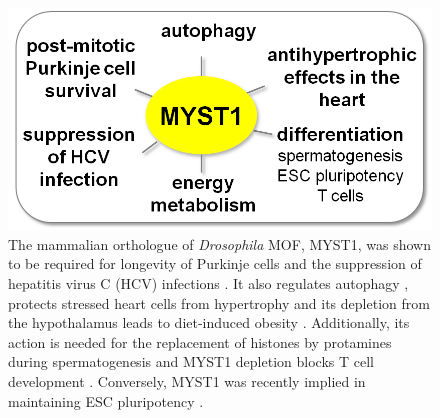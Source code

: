 \begin{figure}[b]
 \begin{minipage}[c]{0.48\textwidth}
   \includegraphics[width=\textwidth]{Figures/MOFothers.png}
 \end{minipage}\hfill
 \begin{minipage}[c]{0.48\textwidth}
	\begin{footnotesize}
   \caption[Functions of the mammalian orthologue of MOF, MYST1.]{\textsf{The mammalian orthologue of \textit{Drosophila} MOF, MYST1, was shown to be required for longevity of Purkinje cells \citep{Kumar2011} and the suppression of hepatitis virus C (HCV) infections \citep{Fusco2013}. It also regulates autophagy \citep{Fullgrabe2013}, protects stressed heart cells from hypertrophy \citep{Qiao2014} and its depletion from the hypothalamus leads to diet-induced obesity \citep{Brenachot2014}. Additionally, its action is needed for the replacement of histones by protamines during spermatogenesis \citep{Meistrich1992,Thomas2007,Lu2010} and MYST1 depletion blocks T cell development \citep{Gupta2013}. Conversely, MYST1 was recently implied in maintaining ESC pluripotency \citep{Li2012}.
}}
\label{fig:MYST}
\end{footnotesize}
 \end{minipage}
\end{figure}
